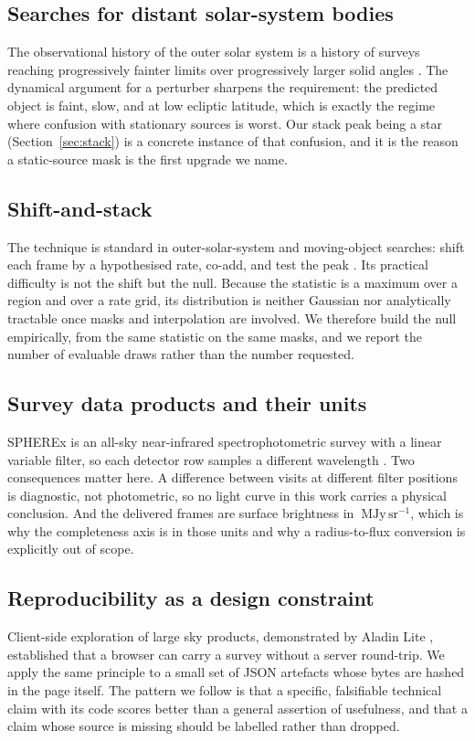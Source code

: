 \documentclass[11pt,a4paper]{article}
\newcommand{\mjysr}{\ \mathrm{MJy\,sr^{-1}}}
\begin{document}
\subsection{Searches for distant solar-system bodies}
The observational history of the outer solar system is a history of surveys
reaching progressively fainter limits over progressively larger solid angles
\citep{trujillo2014}. The dynamical argument for a perturber
\citep{batygin2016,brown2019,brown2021} sharpens the requirement: the predicted
object is faint, slow, and at low ecliptic latitude, which is exactly the regime
where confusion with stationary sources is worst. Our stack peak being a star
(Section~\ref{sec:stack}) is a concrete instance of that confusion, and it is the
reason a static-source mask is the first upgrade we name.

\subsection{Shift-and-stack}
The technique is standard in outer-solar-system and moving-object searches: shift
each frame by a hypothesised rate, co-add, and test the peak \citep{rice2020}. Its
practical difficulty is not the shift but the null. Because the statistic is a
maximum over a region and over a rate grid, its distribution is neither Gaussian
nor analytically tractable once masks and interpolation are involved. We therefore
build the null empirically, from the same statistic on the same masks, and we
report the number of evaluable draws rather than the number requested.

\subsection{Survey data products and their units}
SPHEREx is an all-sky near-infrared spectrophotometric survey with a linear
variable filter, so each detector row samples a different wavelength
\citep{crill2020}. Two consequences matter here. A difference between visits at
different filter positions is diagnostic, not photometric, so no light curve in
this work carries a physical conclusion. And the delivered frames are surface
brightness in $\mjysr$, which is why the completeness axis is in those units and
why a radius-to-flux conversion is explicitly out of scope.

\subsection{Reproducibility as a design constraint}
Client-side exploration of large sky products, demonstrated by Aladin Lite
\citep{boch2014}, established that a browser can carry a survey without a server
round-trip. We apply the same principle to a small set of JSON artefacts whose
bytes are hashed in the page itself. The pattern we follow is that a specific,
falsifiable technical claim with its code scores better than a general assertion
of usefulness, and that a claim whose source is missing should be labelled rather
than dropped.
\end{document}
